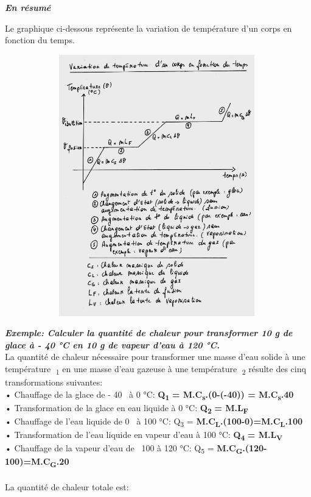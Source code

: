 \emph{\textbf{En résumé }}

Le graphique ci-dessous représente la variation de température d'un
corps en fonction du temps.

\begin{figure}
\centering
\includegraphics[width=11.084cm,height=11.345cm]{Pictures/100000010000024300000307D0F0277ED39C03FA.png}
\caption{}
\end{figure}

\emph{\textbf{Exemple: Calculer la quantité de chaleur pour transformer
10 g de glace à - 40 °C en 10 g de vapeur d'eau à 120 °C.}}\\
La quantité de chaleur nécessaire pour transformer une masse d'eau
solide à une température \textsubscript{1} en une masse d'eau gazeuse à
une température \textsubscript{2} résulte des cinq transformations
suivantes:\\
• Chauffage de la glace de - 40~ à 0 °C:
\textbf{Q}\textsubscript{\textbf{1}}\textbf{ =
M.C}\textsubscript{\textbf{s}}\textbf{.(0-(-40)) =
M.C}\textsubscript{\textbf{s}}\textbf{.40}\\
• Transformation de la glace en eau liquide à 0 °C:
\textbf{Q}\textsubscript{\textbf{2}}\textbf{ =
M.L}\textsubscript{\textbf{F}}\\
• Chauffage de l'eau liquide de 0~ à 100 °C: Q\textsubscript{3} =
\textbf{M.C}\textsubscript{\textbf{L}}\textbf{.(100-0)=M.C}\textsubscript{\textbf{L}}\textbf{.100}\\
• Transformation de l'eau liquide en vapeur d'eau à 100 °C:
\textbf{Q}\textsubscript{\textbf{4}}\textbf{ =
M.L}\textsubscript{\textbf{V}}\\
• Chauffage de la vapeur d'eau de~ 100 à 120 °C: Q\textsubscript{5} =
\textbf{M.C}\textsubscript{\textbf{G}}\textbf{.(120-100)=M.C}\textsubscript{\textbf{G}}\textbf{.20}\\
~\\
La quantité de chaleur totale est:

